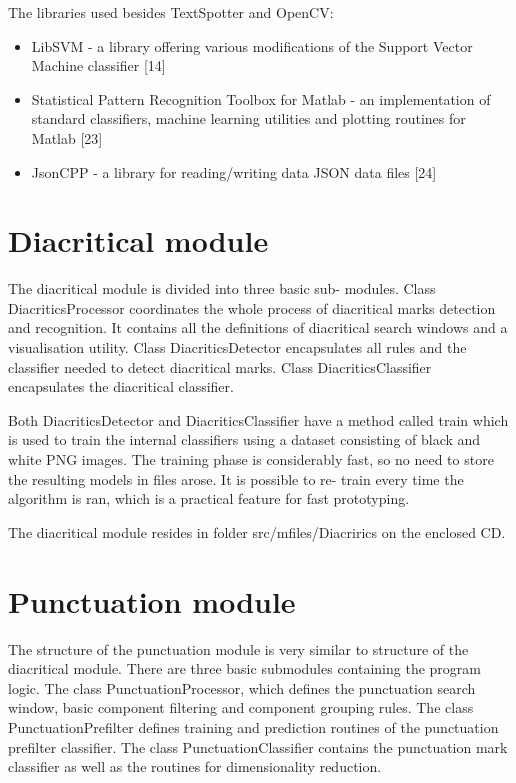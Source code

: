\documentclass[12pt,a4paper]{report}
\begin{document}
The libraries used besides TextSpotter and OpenCV:
\begin{itemize}
    \item LibSVM - a library offering various modifications of the Support Vector Machine classifier [14]
    \item Statistical Pattern Recognition Toolbox for Matlab - an implementation of standard classifiers, machine learning utilities and plotting routines for Matlab [23]
    \item JsonCPP - a library for reading/writing data JSON data files [24]
\end{itemize}

\section{Diacritical module}
The diacritical module is divided into three basic sub- modules. Class DiacriticsProcessor coordinates the whole process of diacritical marks detection and recognition. It contains all the definitions of diacritical search windows and a visualisation utility. Class DiacriticsDetector encapsulates all rules and the classifier needed to detect diacritical marks. Class DiacriticsClassifier encapsulates the diacritical classifier.

Both DiacriticsDetector and DiacriticsClassifier have a method called train which is used to train the internal classifiers using a dataset consisting of black and white PNG images. The training phase is considerably fast, so no need to store the resulting models in files arose. It is possible to re- train every time the algorithm is ran, which is a practical feature for fast prototyping.

The diacritical module resides in folder src/mfiles/Diacrirics on the enclosed CD.

\section{Punctuation module}
The structure of the punctuation module is very similar to structure of the diacritical module. There are three basic submodules containing the program logic. The class PunctuationProcessor, which defines the punctuation search window, basic component filtering and component grouping rules. The class PunctuationPrefilter defines training and prediction routines of the punctuation prefilter classifier. The class PunctuationClassifier contains the punctuation mark classifier as well as the routines for dimensionality reduction.
\end{document}
